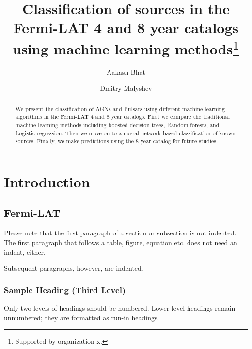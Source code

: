 \documentclass[runningheads]{llncs}
\begin{document}
%
\title{Classification of sources in the Fermi-LAT 4 and 8 year catalogs using machine learning methods\thanks{Supported by organization x.}}
%
%
\author{Aakash Bhat \and
Dmitry Malyshev}
%
%
%
\maketitle              %
%
\begin{abstract}
We present the classification of AGNs and Pulsars using different machine learning algorithms in the Fermi-LAT 4 and 8 year catalogs. First we compare the traditional machine learning methods including boosted decision trees, Random forests, and Logistic regression. Then we move on to a nueral network based classification of known sources. Finally, we make predictions using the 8-year catalog for future studies.

\end{abstract}
%
%
%
\section{Introduction}
\subsection{Fermi-LAT}
Please note that the first paragraph of a section or subsection is
not indented. The first paragraph that follows a table, figure,
equation etc. does not need an indent, either.

Subsequent paragraphs, however, are indented.

\subsubsection{Sample Heading (Third Level)} Only two levels of
headings should be numbered. Lower level headings remain unnumbered;
they are formatted as run-in headings.
\end{document}

